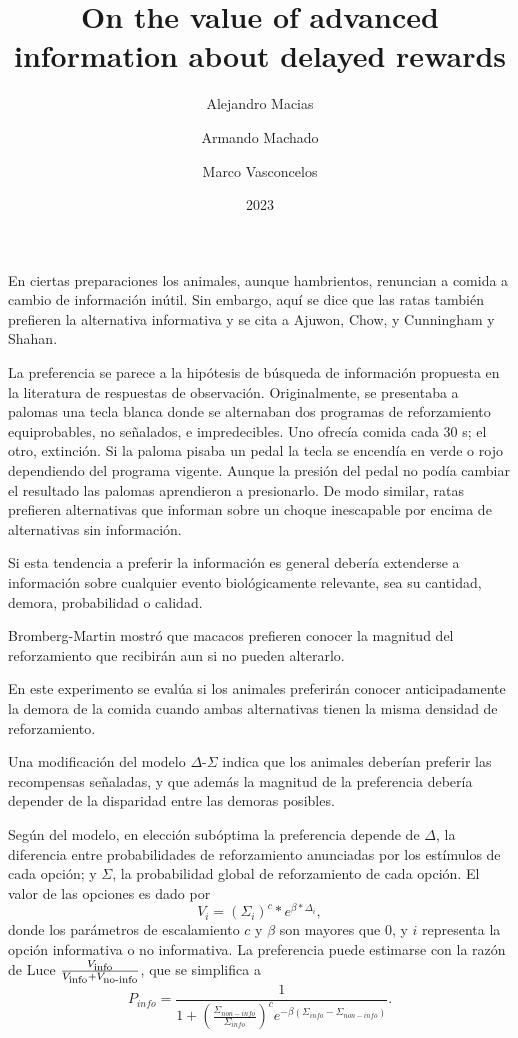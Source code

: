 \documentclass[a4paper,12pt]{article}
\title{On the value of advanced information about delayed rewards}
\author{Alejandro Macias \and Armando Machado \and Marco Vasconcelos}
\date{2023}
\begin{document}
{\scshape\bfseries \maketitle}

En ciertas preparaciones los animales, aunque hambrientos, renuncian a comida a cambio de información inútil.
Sin embargo, aquí se dice que las ratas también prefieren la alternativa informativa y se cita a Ajuwon, Chow, y Cunningham y Shahan.

La preferencia se parece a la hipótesis de búsqueda de información propuesta en la literatura de respuestas de observación.
Originalmente, se presentaba a palomas una tecla blanca donde se alternaban dos programas de reforzamiento equiprobables, no señalados, e impredecibles.
Uno ofrecía comida cada 30 s; el otro, extinción.
Si la paloma pisaba un pedal la tecla se encendía en verde o rojo dependiendo del programa vigente.
Aunque la presión del pedal no podía cambiar el resultado las palomas aprendieron a presionarlo.
De modo similar, ratas prefieren alternativas que informan sobre un choque inescapable por encima de alternativas sin información.

Si esta tendencia a preferir la información es general debería extenderse a información sobre cualquier evento biológicamente relevante, sea su cantidad, demora, probabilidad o calidad.

Bromberg-Martin mostró que macacos prefieren conocer la magnitud del reforzamiento que recibirán aun si no pueden alterarlo.

En este experimento se evalúa si los animales preferirán conocer anticipadamente la demora de la comida cuando ambas alternativas tienen la misma densidad de reforzamiento.

Una modificación del modelo $\Delta$-$\Sigma$ indica que los animales deberían preferir las recompensas señaladas, y que además la magnitud de la preferencia debería depender de la disparidad entre las demoras posibles.

Según del modelo, en elección subóptima la preferencia depende de $\Delta$, la diferencia entre probabilidades de reforzamiento anunciadas por los estímulos de cada opción; y $\Sigma$, la probabilidad global de reforzamiento de cada opción.
El valor de las opciones es dado por
\[
V_i = (\Sigma_i)^{c} * e^{\beta * \Delta_i}
,\]
donde los parámetros de escalamiento $c$ y $\beta$ son mayores que 0, y $i$ representa la opción informativa o no informativa.
La preferencia puede estimarse con la razón de Luce $\frac{V_{\mbox{\scriptsize info}}}{V_{\mbox{\scriptsize info}} + V_{\mbox{\scriptsize no-info}}}$, que se simplifica a
\[
P_{info} = \frac{
    1
}{
    1 + \left(\frac{\Sigma_{non-info}}{\Sigma_{info}}\right) ^{c} e ^{-\beta(\Sigma_{info} - \Sigma_{non-info})}
}
.\]
\end{document}
